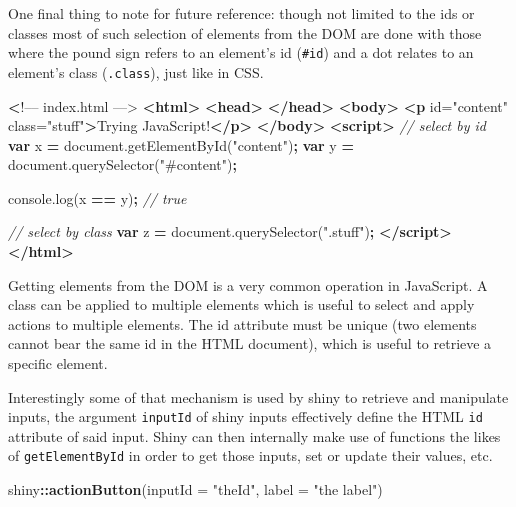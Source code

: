 \documentclass[
  10pt,
]{krantz}
\makeatletter
\newenvironment{Shaded}{\begin{snugshade}}{\end{snugshade}}
\newcommand{\AttributeTok}[1]{\textcolor[rgb]{0.61,0.61,0.61}{#1}}
\newcommand{\CommentTok}[1]{\textcolor[rgb]{0.37,0.37,0.37}{\textit{#1}}}
\newcommand{\DataTypeTok}[1]{\textcolor[rgb]{0.27,0.27,0.27}{#1}}
\newcommand{\ErrorTok}[1]{\textcolor[rgb]{0.14,0.14,0.14}{\textbf{#1}}}
\newcommand{\KeywordTok}[1]{\textcolor[rgb]{0.27,0.27,0.27}{\textbf{#1}}}
\newcommand{\NormalTok}[1]{#1}
\newcommand{\OperatorTok}[1]{\textcolor[rgb]{0.43,0.43,0.43}{\textbf{#1}}}
\newcommand{\OtherTok}[1]{\textcolor[rgb]{0.37,0.37,0.37}{#1}}
\newcommand{\StringTok}[1]{\textcolor[rgb]{0.5,0.5,0.5}{#1}}
\newcommand{\VariableTok}[1]{\textcolor[rgb]{0,0,0}{#1}}
\newenvironment{kframe}{%
\medskip{}
\setlength{\fboxsep}{.8em}
 \def\at@end@of@kframe{}%
 \ifinner\ifhmode%
  \def\at@end@of@kframe{\end{minipage}}%
  \begin{minipage}{\columnwidth}%
 \fi\fi%
 \def\FrameCommand##1{\hskip\@totalleftmargin \hskip-\fboxsep
 \colorbox{shadecolor}{##1}\hskip-\fboxsep
     \hskip-\linewidth \hskip-\@totalleftmargin \hskip\columnwidth}%
 \MakeFramed {\advance\hsize-\width
   \@totalleftmargin\z@ \linewidth\hsize
   \@setminipage}}%
 {\par\unskip\endMakeFramed%
 \at@end@of@kframe}
\renewenvironment{Shaded}{\begin{kframe}}{\end{kframe}}
\makeatother
\begin{document}
One final thing to note for future reference: though not limited to the ids or classes most of such selection of elements from the DOM are done with those where the pound sign refers to an element's id (\texttt{\#id}) and a dot relates to an element's class (\texttt{.class}), just like in CSS.

\begin{Shaded}
\begin{Highlighting}[]
 \ErrorTok{<}\NormalTok{!–– index.html ––>}
\KeywordTok{<html>}
  \KeywordTok{<head>}
  \KeywordTok{</head>}
  \KeywordTok{<body>}
    \KeywordTok{<p}\OtherTok{ id=}\StringTok{"content"}\OtherTok{ class=}\StringTok{"stuff"}\KeywordTok{>}\NormalTok{Trying JavaScript!}\KeywordTok{</p>}
  \KeywordTok{</body>}
  \KeywordTok{<script>}
    \CommentTok{// select by id}
    \KeywordTok{var}\NormalTok{ x }\OperatorTok{=} \VariableTok{document}\NormalTok{.}\AttributeTok{getElementById}\NormalTok{(}\StringTok{"content"}\NormalTok{)}\OperatorTok{;}
    \KeywordTok{var}\NormalTok{ y }\OperatorTok{=} \VariableTok{document}\NormalTok{.}\AttributeTok{querySelector}\NormalTok{(}\StringTok{"\#content"}\NormalTok{)}\OperatorTok{;}

    \VariableTok{console}\NormalTok{.}\AttributeTok{log}\NormalTok{(x }\OperatorTok{==}\NormalTok{ y)}\OperatorTok{;} \CommentTok{// true}

    \CommentTok{// select by class}
    \KeywordTok{var}\NormalTok{ z }\OperatorTok{=} \VariableTok{document}\NormalTok{.}\AttributeTok{querySelector}\NormalTok{(}\StringTok{".stuff"}\NormalTok{)}\OperatorTok{;}
  \KeywordTok{</script>}
\KeywordTok{</html>}
\end{Highlighting}
\end{Shaded}

Getting elements from the DOM is a very common operation in JavaScript. A class can be applied to multiple elements which is useful to select and apply actions to multiple elements. The id attribute must be unique (two elements cannot bear the same id in the HTML document), which is useful to retrieve a specific element.

Interestingly some of that mechanism is used by shiny to retrieve and manipulate inputs, the argument \texttt{inputId} of shiny inputs effectively define the HTML \texttt{id} attribute of said input. Shiny can then internally make use of functions the likes of \texttt{getElementById} in order to get those inputs, set or update their values, etc.

\begin{Shaded}
\begin{Highlighting}[]
\NormalTok{shiny}\OperatorTok{::}\KeywordTok{actionButton}\NormalTok{(}\DataTypeTok{inputId =} \StringTok{"theId"}\NormalTok{, }\DataTypeTok{label =} \StringTok{"the label"}\NormalTok{) }
\end{Highlighting}
\end{Shaded}
\end{document}
